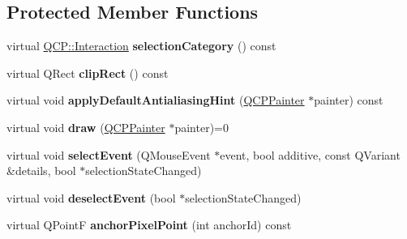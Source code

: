 \subsection*{Protected Member Functions}
\begin{DoxyCompactItemize}
\item 
virtual \hyperlink{namespace_q_c_p_a2ad6bb6281c7c2d593d4277b44c2b037}{Q\+C\+P\+::\+Interaction} {\bfseries selection\+Category} () const \hypertarget{class_q_c_p_abstract_item_a777b5d384936396ad9c3ceb3d3453f1c}{}\label{class_q_c_p_abstract_item_a777b5d384936396ad9c3ceb3d3453f1c}

\item 
virtual Q\+Rect {\bfseries clip\+Rect} () const \hypertarget{class_q_c_p_abstract_item_a538e25ff8856534582f5b2b400a46405}{}\label{class_q_c_p_abstract_item_a538e25ff8856534582f5b2b400a46405}

\item 
virtual void {\bfseries apply\+Default\+Antialiasing\+Hint} (\hyperlink{class_q_c_p_painter}{Q\+C\+P\+Painter} $\ast$painter) const \hypertarget{class_q_c_p_abstract_item_a0839031abdd71067e2256a4d53c7a011}{}\label{class_q_c_p_abstract_item_a0839031abdd71067e2256a4d53c7a011}

\item 
virtual void {\bfseries draw} (\hyperlink{class_q_c_p_painter}{Q\+C\+P\+Painter} $\ast$painter)=0\hypertarget{class_q_c_p_abstract_item_ad0dc056f650c3ca73414e6b4f01674ef}{}\label{class_q_c_p_abstract_item_ad0dc056f650c3ca73414e6b4f01674ef}

\item 
virtual void {\bfseries select\+Event} (Q\+Mouse\+Event $\ast$event, bool additive, const Q\+Variant \&details, bool $\ast$selection\+State\+Changed)\hypertarget{class_q_c_p_abstract_item_aaf92af7b9893712959a6c073d334d88d}{}\label{class_q_c_p_abstract_item_aaf92af7b9893712959a6c073d334d88d}

\item 
virtual void {\bfseries deselect\+Event} (bool $\ast$selection\+State\+Changed)\hypertarget{class_q_c_p_abstract_item_a91f090d6763cfedb0749219c63788ae9}{}\label{class_q_c_p_abstract_item_a91f090d6763cfedb0749219c63788ae9}

\item 
virtual Q\+PointF {\bfseries anchor\+Pixel\+Point} (int anchor\+Id) const \hypertarget{class_q_c_p_abstract_item_a94bde62b8a2fc133666dcbb8035deeed}{}\label{class_q_c_p_abstract_item_a94bde62b8a2fc133666dcbb8035deeed}


\end{DoxyCompactItemize}

